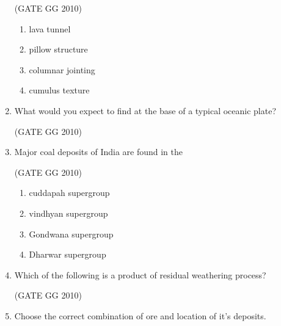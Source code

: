 \documentclass[journal]{IEEEtran}
\begin{document}
\begin{enumerate}[start=1]
\hfill{(GATE GG 2010)}

\begin{enumerate}
    \item lava tunnel
    \item pillow structure
    \item columnar jointing
    \item cumulus texture
\end{enumerate}

\item What would you expect to find at the base of a typical oceanic plate?

\hfill{(GATE GG 2010)}

\begin{enumerate}
\end{enumerate}

\item Major coal deposits of India are found in the

\hfill{(GATE GG 2010)}

\begin{enumerate}
    \item cuddapah supergroup
    \item vindhyan supergroup
    \item Gondwana supergroup
    \item Dharwar supergroup
\end{enumerate}

\item Which of the following is a product of residual weathering process?

\hfill{(GATE GG 2010)}

\begin{enumerate}
\end{enumerate}

\item Choose the correct combination of ore and location of it's deposits.


\end{enumerate}
\end{document}
